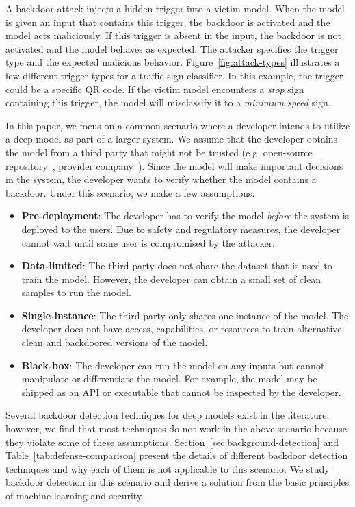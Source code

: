 \documentclass[letterpaper,twocolumn,10pt]{article}
\begin{document}
A backdoor attack injects a hidden trigger into a victim model. When the model is given an input that contains this trigger, the backdoor is activated and the model acts maliciously. If this trigger is absent in the input, the backdoor is not activated and the model behaves as expected. The attacker specifies the trigger type and the expected malicious behavior. Figure~\ref{fig:attack-types} illustrates a few different trigger types for a traffic sign classifier. In this example, the trigger could be a specific QR code. If the victim model encounters a \textit{stop} sign containing this trigger, the model will misclassify it to a \textit{minimum speed} sign.

In this paper, we focus on a common scenario where a developer intends to utilize a deep model as part of a larger system. We assume that the developer obtains the model from a third party that might not be trusted (e.g. open-source repository~\cite{jain2022huggingface}, provider company~\cite{ribeiro2015mlaas}). Since the model will make important decisions in the system, the developer wants to verify whether the model contains a backdoor. Under this scenario, we make a few assumptions:
\begin{itemize}
\item \textbf{Pre-deployment}: The developer has to verify the model \textit{before} the system is deployed to the users. Due to safety and regulatory measures, the developer cannot wait until some user is compromised by the attacker.
\item \textbf{Data-limited}: The third party does not share the dataset that is used to train the model. However, the developer can obtain a small set of clean samples to run the model.
\item \textbf{Single-instance}: The third party only shares one instance of the model. The developer does not have access, capabilities, or resources to train alternative clean and backdoored versions of the model.
\item \textbf{Black-box}: The developer can run the model on any inputs but cannot manipulate or differentiate the model. For example, the model may be shipped as an API or executable that cannot be inspected by the developer.
\end{itemize}

Several backdoor detection techniques for deep models exist in the literature, however, we find that most techniques do not work in the above scenario because they violate some of these assumptions. Section~\ref{sec:background-detection} and Table~\ref{tab:defense-comparison} present the details of different backdoor detection techniques and why each of them is not applicable to this scenario.
We study backdoor detection in this scenario and derive a solution from the basic principles of machine learning and security.
\end{document}
